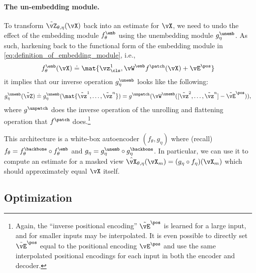 \documentclass[../../book-main.tex]{subfiles}
\begin{document}
\paragraph{The un-embedding module.} To transform \(\tilde{\vZ}_{\theta, \eta}(\vX)\) back into an estimate for \(\vX\), we need to undo the effect of the embedding module \(f_{\theta}^{\emb}\) using the unembedding module \(g_{\eta}^{\unemb}\). As such, harkening back to the functional form of the embedding module in \eqref{eq:definition_of_embedding_module}, i.e.,
\begin{equation}
    f_{\theta}^{\emb}(\vX) \doteq \mat{\vz_{\cls}^{1}, \vW^{\emb}f^{\patch}(\vX) + \vE^{\pos}}
\end{equation}
it implies that our inverse operation \(g_{\eta}^{\unemb}\) looks like the following:
\begin{equation}
    g_{\eta}^{\unemb}(\tilde{\vZ}) \doteq g_{\eta}^{\unemb}(\mat{\tilde{\vz}^{1}, \dots, \tilde{\vz}^{n}}) = g^{\unpatch}(\vW^{\unemb}([\tilde{\vz}^{2}, \dots, \tilde{\vz}^{n}] - \tilde{\vE}^{\pos})),
\end{equation}
where \(g^{\unpatch}\) does the inverse operation of the unrolling and flattening operation that \(f^{\patch}\) does.\footnote{Again, the ``inverse positional encoding'' \(\tilde{\vE}^{\pos}\) is learned for a large input, and for smaller inputs may be interpolated. It is even possible to directly set \(\tilde{\vE}^{\pos}\) equal to the positional encoding \(\vE^{\pos}\) and use the same interpolated positional encodings for each input in both the encoder and decoder.}

This architecture is a white-box autoencoder \((f_{\theta}, g_{\eta})\) where (recall) \(f_{\theta} = f_{\theta}^{\backbone} \circ f_{\theta}^{\emb}\) and \(g_{\eta} = g_{\eta}^{\unemb} \circ g_{\eta}^{\backbone}\). In particular, we can use it to compute an estimate for a masked view \(\hat{\vX}_{\theta, \eta}(\vX_{m}) = (g_{\eta} \circ f_{\eta})(\vX_{m})\) which should approximately equal \(\vX\) itself.

\subsection{Optimization}\label{sub:image_completion_optimization}
\end{document}
